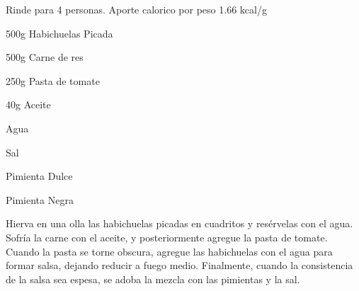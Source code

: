 
Rinde para 4 personas. Aporte calorico por peso 1.66 kcal/g

\begin{ingredientes}
\item 500g Habichuelas Picada
\item 500g Carne de res
\item 250g Pasta de tomate
\item 40g Aceite
\item Agua
\item Sal
\item Pimienta Dulce
\item Pimienta Negra
\end{ingredientes}
\preparacion

Hierva en una olla las habichuelas picadas en cuadritos y resérvelas con el agua. Sofría la carne con el aceite, y posteriormente agregue la pasta de tomate. Cuando  la pasta se torne obscura, agregue las habichuelas con el agua para formar salsa, dejando reducir a fuego medio. Finalmente, cuando la consistencia de la salsa sea espesa, se adoba la mezcla con las pimientas y la sal.



